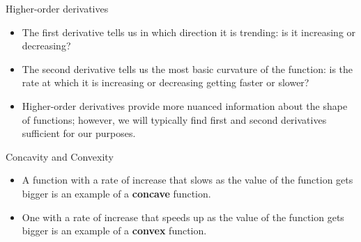 \documentclass[
  ignorenonframetext,
]{beamer}
\begin{document}
\begin{frame}{Higher-order derivatives}
\protect\hypertarget{higher-order-derivatives-2}{}

\begin{itemize}
\item
  The first derivative tells us in which direction it is trending: is it
  increasing or decreasing?
\item
  The second derivative tells us the most basic curvature of the
  function: is the rate at which it is increasing or decreasing getting
  faster or slower?
\item
  Higher-order derivatives provide more nuanced information about the
  shape of functions; however, we will typically find first and second
  derivatives sufficient for our purposes.
\end{itemize}

\end{frame}

\begin{frame}{Concavity and Convexity}
\protect\hypertarget{concavity-and-convexity}{}

\begin{itemize}
\item
  A function with a rate of increase that slows as the value of the
  function gets bigger is an example of a \textbf{concave} function.
\item
  One with a rate of increase that speeds up as the value of the
  function gets bigger is an example of a \textbf{convex} function.
\end{itemize}

\end{frame}
\end{document}
